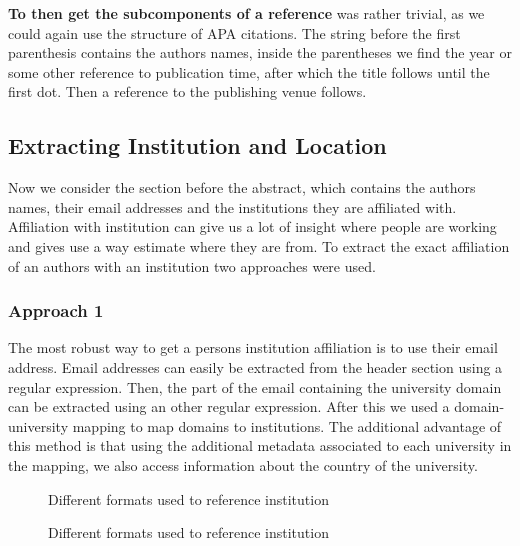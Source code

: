 \documentclass[article,twocolumn]{IEEEtran}
\begin{document}
\textbf{To then get the subcomponents of a reference} was rather
trivial, as we could again use the structure of APA citations. The
string before the first parenthesis contains the authors names, inside
the parentheses we find the year or some other reference to publication
time, after which the title follows until the first dot. Then a
reference to the publishing venue follows.

    \hypertarget{extracting-institution-and-location}{%
\subsection{Extracting Institution and
Location}\label{extracting-institution-and-location}}

Now we consider the section before the abstract, which contains the
authors names, their email addresses and the institutions they are
affiliated with. Affiliation with institution can give us a lot of
insight where people are working and gives use a way estimate where they
are from. To extract the exact affiliation of an authors with an
institution two approaches were used.

\hypertarget{approach-1}{%
\subsubsection{Approach 1}\label{approach-1}}

The most robust way to get a persons institution affiliation is to use
their email address. Email addresses can easily be extracted from the
header section using a regular expression. Then, the part of the email
containing the university domain can be extracted using an other regular
expression. After this we used a domain-university mapping
\cite{mapping} to map domains to institutions. The additional advantage
of this method is that using the additional metadata associated to each
university in the mapping, we also access information about the country
of the university.


    \begin{figure}
        \begin{center}\end{center}
        \caption{Different formats used to reference institution}
        \label{figA}
    \end{figure}
    

    \begin{figure}
        \begin{center}\end{center}
        \caption{Different formats used to reference institution}
        \label{figB}
    \end{figure}
    
\end{document}
